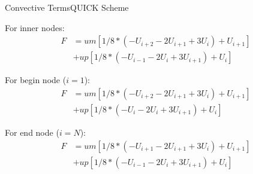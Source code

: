 \documentclass{beamer}
\begin{document}

\begin{frame}{Convective Terms}{QUICK Scheme}
	
	For inner nodes:
	\begin{equation}
		\begin{split}
			F &= um \left[ 1/8 * \left( -U_{i+2} - 2 U_{i+1} + 3 U_{i} \right) + U_{i+1} \right] \\
			&+ up \left[ 1/8 * \left( -U_{i-1} - 2 U_{i} + 3 U_{i+1} \right) + U_{i} \right]
		\end{split}
	\end{equation}
	
	For begin node ($i=1$):
	\begin{equation}
		\begin{split}
			F &= um \left[ 1/8 * \left( -U_{i+2} - 2 U_{i+1} + 3 U_{i} \right) + U_{i+1} \right] \\
			&+ up \left[ 1/8 * \left( -U_{i} - 2 U_{i} + 3 U_{i+1} \right) + U_{i} \right]
		\end{split}
	\end{equation}
	
	For end node ($i=N$):
	\begin{equation}
		\begin{split}
			F &= um \left[ 1/8 * \left( -U_{i+1} - 2 U_{i+1} + 3 U_{i} \right) + U_{i+1} \right] \\
			&+ up \left[ 1/8 * \left( -U_{i-1} - 2 U_{i} + 3 U_{i+1} \right) + U_{i} \right]
		\end{split}
	\end{equation}
	
\end{frame}
\end{document}
